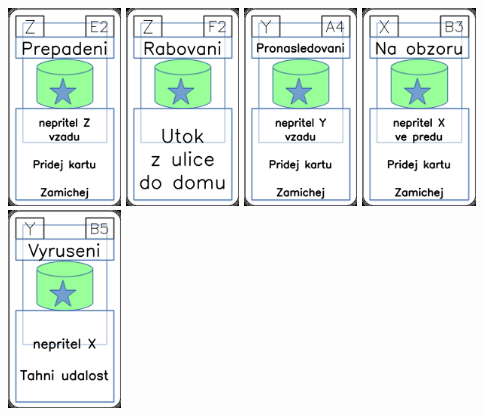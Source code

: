 \documentclass[a4paper]{article}
\begin{document}
	\includegraphics[width=3.0cm]{img-5_51}
	\includegraphics[width=3.0cm]{img-5_56}
	\includegraphics[width=3.0cm]{img-5_33}
	\includegraphics[width=3.0cm]{img-5_7}
	\includegraphics[width=3.0cm]{img-5_39}
\end{document}
